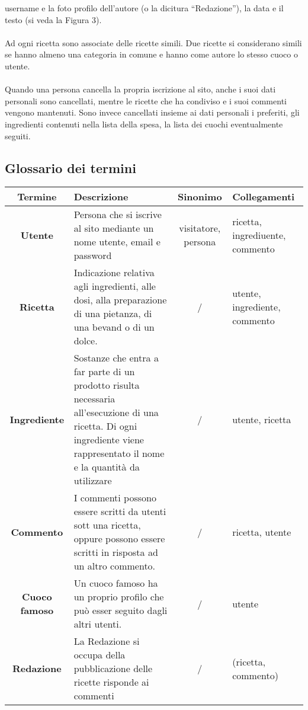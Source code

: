 \documentclass[12pt]{extarticle}
\begin{document}
username e la foto profilo dell’autore (o la dicitura “Redazione”), la data e il testo (si veda la Figura
3).
\\\\
Ad ogni ricetta sono associate delle ricette simili. Due ricette si considerano simili se hanno
almeno una categoria in comune e hanno come autore lo stesso cuoco o utente.
\\\\
Quando una persona cancella la propria iscrizione al sito, anche i suoi dati personali sono
cancellati, mentre le ricette che ha condiviso e i suoi commenti vengono mantenuti. Sono invece
cancellati insieme ai dati personali i preferiti, gli ingredienti contenuti nella lista della spesa, la lista
dei cuochi eventualmente seguiti.

\newpage

\subsection{Glossario dei termini}
\vspace{2cm}
    \begin{tabularx}{17cm}{c|X|c|X}
    \bfseries Termine      & \bfseries Descrizione  & \bfseries Sinonimo  & \bfseries Collegamenti\\ 
    \hline\hline
    \bfseries Utente       & Persona che si iscrive al sito mediante un nome utente, email e password                                                                                                            & visitatore, persona & ricetta, ingrediuente, commento \\ 
    \hline
    \bfseries Ricetta      & Indicazione relativa agli ingredienti, alle dosi, alla preparazione di una pietanza, di una bevand o di un dolce.                                                              & /                   & utente, ingrediente, commento   \\
    \hline
    \bfseries Ingrediente  & Sostanze che entra a far parte di un prodotto  risulta necessaria all'esecuzione di una ricetta. Di ogni ingrediente viene rappresentato  il nome e la quantità da utilizzare & /                   & utente, ricetta                 \\
    \hline
    \bfseries Commento     & I commenti possono essere scritti da utenti sott una ricetta, oppure possono essere scritti in risposta ad un altro commento.                                                     & /                   & ricetta, utente                 \\
    \hline
    \bfseries Cuoco famoso & Un cuoco famoso ha un proprio profilo che può esser seguito dagli altri utenti.                                                                                                      & /                   & utente                          \\
    \hline
    \bfseries Redazione    & La Redazione si occupa della pubblicazione delle ricette  risponde ai commenti                                                                                                        & /                   & (ricetta, commento)             \\
    \end{tabularx}
\end{document}
